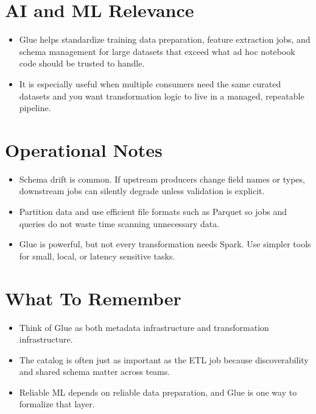 \documentclass[10pt,twocolumn]{article}
\begin{document}
\section*{AI and ML Relevance}
\begin{itemize}
\item Glue helps standardize training data preparation, feature extraction jobs, and schema management for large datasets that exceed what ad hoc notebook code should be trusted to handle.
\item It is especially useful when multiple consumers need the same curated datasets and you want transformation logic to live in a managed, repeatable pipeline.
\end{itemize}

\section*{Operational Notes}
\begin{itemize}
\item Schema drift is common. If upstream producers change field names or types, downstream jobs can silently degrade unless validation is explicit.
\item Partition data and use efficient file formats such as Parquet so jobs and queries do not waste time scanning unnecessary data.
\item Glue is powerful, but not every transformation needs Spark. Use simpler tools for small, local, or latency sensitive tasks.
\end{itemize}

\section*{What To Remember}
\begin{itemize}
\item Think of Glue as both metadata infrastructure and transformation infrastructure.
\item The catalog is often just as important as the ETL job because discoverability and shared schema matter across teams.
\item Reliable ML depends on reliable data preparation, and Glue is one way to formalize that layer.
\end{itemize}
\end{document}
